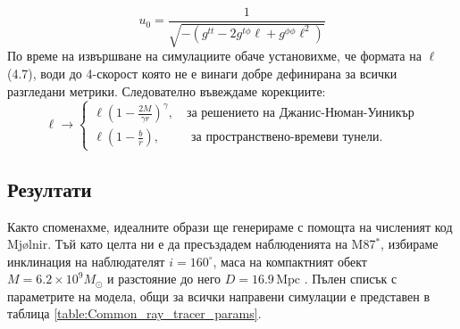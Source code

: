 \documentclass[12pt]{article}
\numberwithin{equation}{section}
\numberwithin{figure}{section}
\begin{document}
	\begin{equation}
		u_0 = \frac{1}{\sqrt{-(g^{tt} - 2g^{t\phi}\ell + g^{\phi\phi}\ell^2)}}
	\end{equation}
	По време на извършване на симулациите обаче установихме, че формата на $\ell$ (4.7), води до 4-скорост която не е винаги добре дефинирана за всички разгледани метрики. Следователно въвеждаме корекциите:
	\begin{equation}
		\ell\rightarrow\begin{cases}
			\ell \left(1 - \frac{2M}{\gamma r}\right)^{\gamma}, \quad\text{за решението на Джанис-Нюман-Уиникър}\\
			\ell \left(1 - \frac{b}{r}\right), \,\,\,\qquad\text{за пространствено-времеви тунели}.
		\end{cases}
	\end{equation}
	
	\subsection{Резултати}
	
	Както споменахме, идеалните образи ще генерираме с помощта на численият код Mjølnir. Тъй като целта ни е да пресъздадем наблюденията на M87$^*$, избираме инклинация на наблюдателят $i = 160^\circ$, маса на компактният обект $M = 6.2\times 10^9M_\odot$ и разстояние до него $D = 16.9\, \text{Mpc}$ \cite{EHT_M87_I}. Пълен списък с параметрите на модела, общи за всички направени симулации е представен в таблица \ref{table:Common_ray_tracer_params}.\\
	
\end{document}
